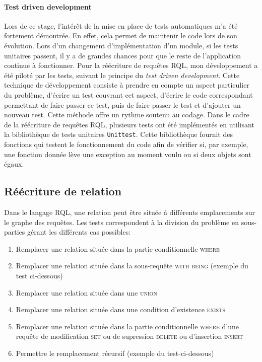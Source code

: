 \documentclass {report}
\begin{document}
\paragraph{Test driven development}
Lors de ce stage, l'intérêt de la mise en place de tests automatiques m'a été fortement démontrée. En effet, cela permet de maintenir le code lors de son évolution. Lors d’un changement d’implémentation d’un module, si les tests unitaires passent, il y a de grandes chances pour que le reste de l’application continue à fonctionner. Pour la réécriture de requêtes RQL, mon développement a été piloté par les tests, suivant le principe du \textit{test driven development}. Cette technique de développement consiste à prendre en compte un aspect particulier du problème, d'écrire un test couvrant cet aspect, d'écrire le code correspondant permettant de faire passer ce test, puis de faire passer le test et d'ajouter un nouveau test. Cette méthode offre un rythme soutenu au codage. Dans le cadre de la réécriture de requêtes RQL, plusieurs tests ont été implémentés en utilisant la bibliothèque de tests unitaires \verb+Unittest+. Cette bibliothèque fournit des fonctions qui testent le fonctionnement du code afin de vérifier si, par exemple, une fonction donnée lève une exception au moment voulu ou si deux objets sont égaux. 


\subsection{Réécriture de relation}
Dans le langage RQL, une relation peut être située à différents emplacements sur le graphe des requêtes. Les tests correspondent à la division du problème en sous-parties gérant les différents cas possibles:
\begin{enumerate}
\item Remplacer une relation située dans la partie conditionnelle \textsc{where}
\item Remplacer une relation située dans la sous-requête \textsc{with being} (exemple du test ci-dessous)
\item Remplacer une relation située dans une \textsc{union}
\item Remplacer une relation située dans une condition d'existence \textsc{exists}
\item Remplacer une relation située dans la partie conditionnelle \textsc{where} d'une requête de modification \textsc{set} ou de supression \textsc{delete} ou d'insertion \textsc{insert}
\item Permettre le remplacement récursif (exemple du test-ci-dessous)
\end{enumerate}
\renewcommand{\lstlistingname}{Test}
\end{document}
